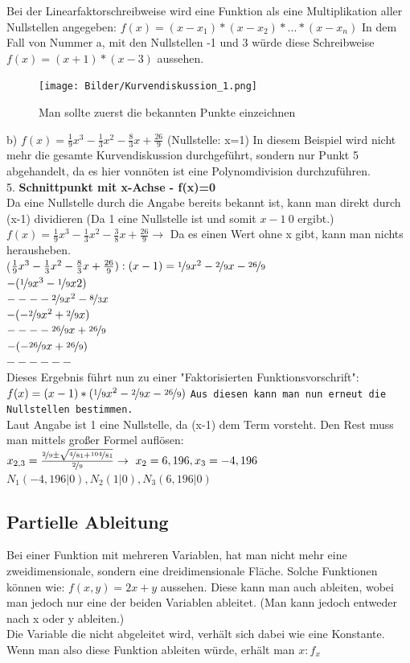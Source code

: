 \documentclass{article}
\begin{document}
	Bei der Linearfaktorschreibweise wird eine Funktion als eine Multiplikation aller Nullstellen angegeben: $f(x)=(x-x_1)*(x-x_2)*...*(x-x_n)$ In dem Fall von Nummer a, mit den Nullstellen -1 und 3 würde diese Schreibweise $f(x)=(x+1)*(x-3)$ aussehen. \\
	\begin{figure}[H]
	\centering
	\texttt{[image: Bilder/Kurvendiskussion\_1.png]}
	\caption{Man sollte zuerst die bekannten Punkte einzeichnen}
	\end{figure}
	b) $f(x)=\frac{1}{9}x^3-\frac{1}{3}x^2-\frac{8}{3}x+\frac{26}{9}$ (Nullstelle: x=1) In diesem Beispiel wird nicht mehr die gesamte Kurvendiskussion durchgeführt, sondern nur Punkt 5 abgehandelt, da es hier vonnöten ist eine Polynomdivision durchzuführen. \\
	5. \textbf{Schnittpunkt mit x-Achse - f(x)=0} \\
	Da eine Nullstelle durch die Angabe bereits bekannt ist, kann man direkt durch (x-1) dividieren (Da 1 eine Nullstelle ist und somit $x - 1\ 0$ ergibt.)
	$f(x)=\frac{1}{9}x^3-\frac{1}{3}x^2-\frac{3}{8}x+\frac{26}{9}\to $ Da es einen Wert ohne x gibt, kann man nichts herausheben. \\
	($\frac{1}{9}x^3-\frac{1}{3}x^2-\frac{8}{3}x+\frac{26}{9}):(x-1)=\nicefrac{1}{9}x^2 -\nicefrac{2}{9}x-\nicefrac{26}{9}$\\
	$-(\nicefrac{1}{9}x^3-\nicefrac{1}{9}x2)$ \\
	$--- -\nicefrac{2}{9}x^2-\nicefrac{8}{3}x$ \\
	$-(-\nicefrac{2}{9}x^2+\nicefrac{2}{9}x)$ \\
	$--- -\nicefrac{26}{9}x+\nicefrac{26}{9}$ \\
  $-(-\nicefrac{26}{9}x+\nicefrac{26}{9})$ \\
	$--- ---$ \\
	Dieses Ergebnis führt nun zu einer "Faktorisierten Funktionsvorschrift": \\
	$f(x)=(x-1)*(\nicefrac{1}{9}x^2-\nicefrac{2}{9}x-\nicefrac{26}{9})$ \verb|Aus diesen kann man nun erneut die Nullstellen bestimmen.| \\
	Laut Angabe ist 1 eine Nullstelle, da (x-1) dem Term vorsteht. Den Rest muss man mittels großer Formel auflösen: \\
	$x_{2,3}=\frac{\nicefrac{2}{9}\pm\sqrt{\nicefrac{4}{81}+\nicefrac{104}{81}}}{\nicefrac{2}{9}}\to\ x_2=6,196, x_3=-4,196$ \\
	$N_1(-4,196|0), N_2(1|0), N_3(6,196|0)$
	\subsection{Partielle Ableitung}
	Bei einer Funktion mit mehreren Variablen, hat man nicht mehr eine zweidimensionale, sondern eine dreidimensionale Fläche. Solche Funktionen können wie: $f(x,y)=2x+y$ aussehen. Diese kann man auch ableiten, wobei man jedoch nur eine der beiden Variablen ableitet. (Man kann jedoch entweder nach x oder y ableiten.) \\
	Die Variable die nicht abgeleitet wird, verhält sich dabei wie eine Konstante. \\
	Wenn man also diese Funktion ableiten würde, erhält man $x:f_x$
\end{document}
